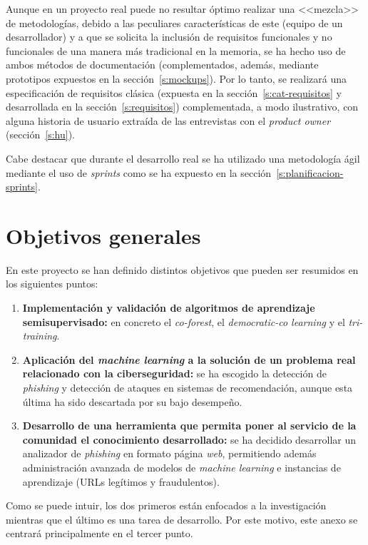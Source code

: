 Aunque en un proyecto real puede no resultar óptimo realizar una <<mezcla>> de metodologías, debido a las peculiares características de este (equipo de un desarrollador) y a que se solicita la inclusión de requisitos funcionales y no funcionales de una manera más tradicional en la memoria, se ha hecho uso de ambos métodos de documentación (complementados, además, mediante prototipos expuestos en la sección~\ref{s:mockups}). Por lo tanto, se realizará una especificación de requisitos clásica (expuesta en la sección~\ref{s:cat-requisitos} y desarrollada en la sección~\ref{s:requisitos}) complementada, a modo ilustrativo, con alguna historia de usuario extraída de las entrevistas con el \textit{product owner} (sección~\ref{s:hu}). 

Cabe destacar que durante el desarrollo real se ha utilizado una metodología ágil mediante el uso de \textit{sprints} como se ha expuesto en la sección~\ref{s:planificacion-sprints}.

\section{Objetivos generales}

En este proyecto se han definido distintos objetivos que pueden ser resumidos en los siguientes puntos:
\begin{enumerate}
	\item \textbf{Implementación y validación de algoritmos de aprendizaje semisupervisado:} en concreto el \textit{co-forest}, el \textit{democratic-co learning} y el \textit{tri-training}.
	\item \textbf{Aplicación del \textit{machine learning} a la solución de un problema real relacionado con la ciberseguridad:} se ha escogido la detección de \textit{phishing} y detección de ataques en sistemas de recomendación, aunque esta última ha sido descartada por su bajo desempeño.
	\item \textbf{Desarrollo de una herramienta que permita poner al servicio de la comunidad el conocimiento desarrollado:} se ha decidido desarrollar un analizador de \textit{phishing} en formato página \textit{web}, permitiendo además administración avanzada de modelos de \textit{machine learning} e instancias de aprendizaje (URLs legítimos y fraudulentos).
\end{enumerate}

Como se puede intuir, los dos primeros están enfocados a la investigación mientras que el último es una tarea de desarrollo. Por este motivo, este anexo se centrará principalmente en el tercer punto.

